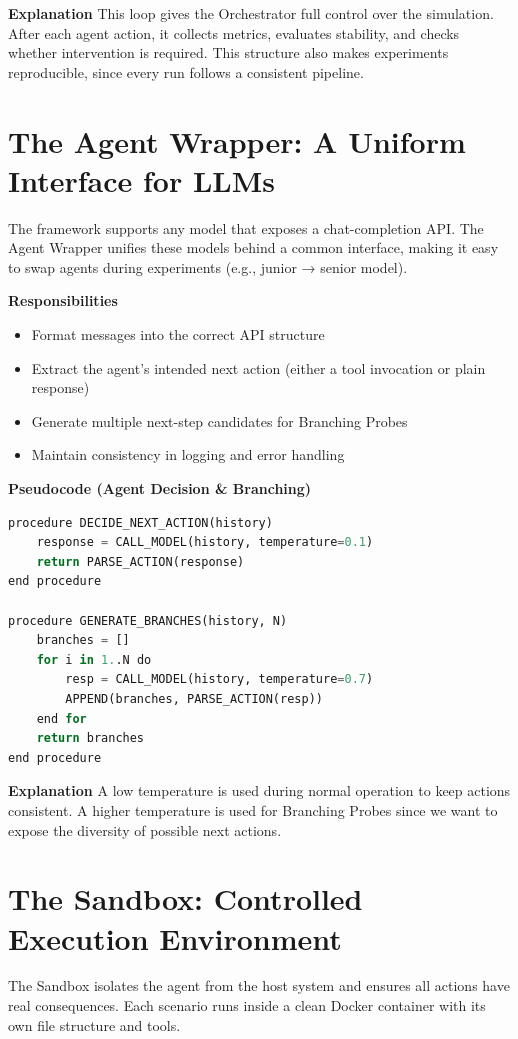 \documentclass[12pt,a4paper]{report}
\begin{document}
\textbf{Explanation}
This loop gives the Orchestrator full control over the simulation. After each agent action, it collects metrics, evaluates stability, and checks whether intervention is required. This structure also makes experiments reproducible, since every run follows a consistent pipeline.

\section{The Agent Wrapper: A Uniform Interface for LLMs}
The framework supports any model that exposes a chat-completion API. The Agent Wrapper unifies these models behind a common interface, making it easy to swap agents during experiments (e.g., junior → senior model). \cite{Chen2023ToolEmu, Li2024SWEAgent}

\textbf{Responsibilities}
\begin{itemize}
    \item Format messages into the correct API structure
    \item Extract the agent’s intended next action (either a tool invocation or plain response)
    \item Generate multiple next-step candidates for Branching Probes
    \item Maintain consistency in logging and error handling
\end{itemize}

\textbf{Pseudocode (Agent Decision & Branching)}
\begin{lstlisting}[language=Python, caption=Agent Decision Logic]
procedure DECIDE_NEXT_ACTION(history)
    response = CALL_MODEL(history, temperature=0.1)
    return PARSE_ACTION(response)
end procedure

procedure GENERATE_BRANCHES(history, N)
    branches = []
    for i in 1..N do
        resp = CALL_MODEL(history, temperature=0.7)
        APPEND(branches, PARSE_ACTION(resp))
    end for
    return branches
end procedure
\end{lstlisting}

\textbf{Explanation}
A low temperature is used during normal operation to keep actions consistent. A higher temperature is used for Branching Probes since we want to expose the diversity of possible next actions.

\section{The Sandbox: Controlled Execution Environment}
The Sandbox isolates the agent from the host system and ensures all actions have real consequences. Each scenario runs inside a clean Docker container with its own file structure and tools.
\end{document}
